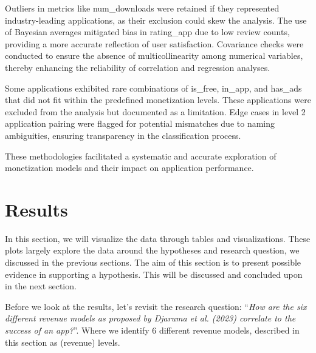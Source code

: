\documentclass[
  12pt,
  a4paper,
]{article}
\begin{document}
Outliers in metrics like num\_downloads were retained if they
represented industry-leading applications, as their exclusion could skew
the analysis. The use of Bayesian averages mitigated bias in rating\_app
due to low review counts, providing a more accurate reflection of user
satisfaction. Covariance checks were conducted to ensure the absence of
multicollinearity among numerical variables, thereby enhancing the
reliability of correlation and regression analyses.

Some applications exhibited rare combinations of is\_free, in\_app, and
has\_ads that did not fit within the predefined monetization levels.
These applications were excluded from the analysis but documented as a
limitation. Edge cases in level 2 application pairing were flagged for
potential mismatches due to naming ambiguities, ensuring transparency in
the classification process.

These methodologies facilitated a systematic and accurate exploration of
monetization models and their impact on application performance.

\section{\texorpdfstring{Results }{Results }}\label{results}

In this section, we will visualize the data through tables and
visualizations. These plots largely explore the data around the
hypotheses and research question, we discussed in the previous sections.
The aim of this section is to present possible evidence in supporting a
hypothesis. This will be discussed and concluded upon in the next
section.

Before we look at the results, let's revisit the research question:
``\emph{How are the six different revenue models as proposed by Djaruma
et al. (2023) correlate to the success of an app?}''. Where we identify
6 different revenue models, described in this section as (revenue)
levels.
\end{document}

